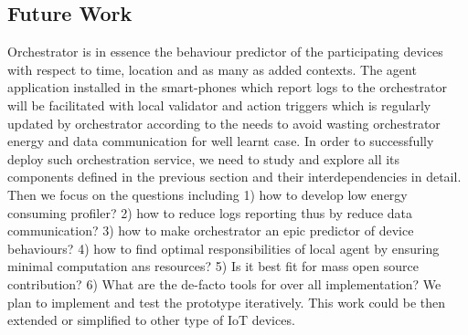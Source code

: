 \subsection{Future Work}
Orchestrator is in essence the behaviour predictor of the participating devices with respect to time, location and as many as added contexts. The agent application installed in the smart-phones which report logs to the orchestrator will be facilitated with local validator and action triggers which is regularly updated by orchestrator according to the needs to avoid wasting orchestrator energy and data communication for well learnt case. In order to successfully deploy such orchestration service, we need to study and explore all its components defined in the previous section and their interdependencies in detail.  Then we focus on the questions including 1) how to develop low energy consuming profiler? 2) how to reduce logs reporting thus by reduce data communication? 3) how to make orchestrator an epic predictor of device behaviours? 4) how to find optimal responsibilities of local agent by ensuring minimal computation ans resources? 5) Is it best fit for mass open source contribution? 6) What are the de-facto tools for over all implementation? We plan to implement and test the prototype iteratively. This work could be then extended or simplified to other type of IoT devices.









